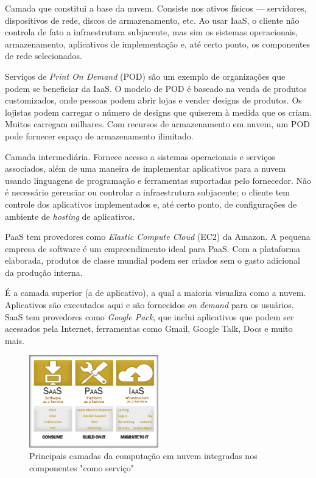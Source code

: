 \begin{itemise}

     Camada que constitui a base da nuvem.
    Consiste nos ativos físicos --- servidores, dispositivos de rede, discos de armazenamento,
    etc. Ao usar IaaS, o cliente não controla de fato a infraestrutura subjacente, mas sim
    os sistemas operacionais, armazenamento, aplicativos de implementação e, até certo ponto,
    os componentes de rede selecionados. 

    Serviços de \emph{Print On Demand} (POD) são um exemplo de organizações que podem se
    beneficiar da IaaS. O modelo de POD é baseado na venda de produtos customizados, onde
    pessoas podem abrir lojas e vender designs de produtos. Os lojistas podem carregar
    o número de designs que quiserem à medida que os criam. Muitos carregam milhares.
    Com recursos de armazenamento em nuvem, um POD pode fornecer espaço de armazenamento
    ilimitado.

     Camada intermediária. Fornece acesso a
    sistemas operacionais e serviços associados, além de uma maneira de implementar
    aplicativos para a nuvem usando linguagens de programação e ferramentas suportadas
    pelo fornecedor. Não é necessário gerenciar ou controlar a infraestrutura subjacente;
    o cliente tem controle dos aplicativos implementados e, até certo ponto, de configurações
    de ambiente de \emph{hosting} de aplicativos. 

    PaaS tem provedores como \emph{Elastic Compute Cloud} (EC2) da Amazon. A pequena 
empresa de software é um empreendimento ideal para PaaS. Com a plataforma elaborada,
produtos de classe mundial podem ser criados sem o gasto adicional da produção
interna.

     É a camada superior (a de aplicativo), a qual
    a maioria visualiza como a nuvem. Aplicativos são executados aqui e são fornecidos
    \emph{on demand} para os usuários. SaaS tem provedores como \emph{Google Pack}, que
    inclui aplicativos que podem ser acessados pela Internet, ferramentas como Gmail,
    Google Talk, Docs e muito mais.
\end{itemise}

\begin{figure}[H]
    \centering
    \includegraphics[width=0.5\textwidth]{img/services2.png}
    \caption{Principais camadas da computação em nuvem integradas nos componentes
        "como serviço"
    }
    \label{fig:layers}
\end{figure}


